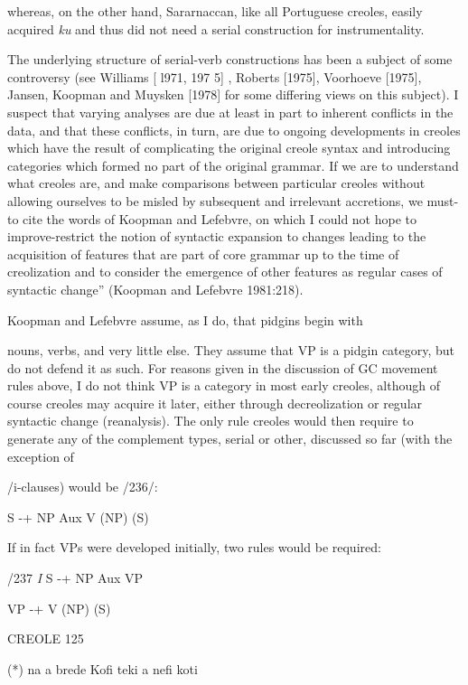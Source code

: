 whereas, on the other hand, Sararnaccan, like all Portuguese creoles, easily acquired \textit{ku} and thus did not need a serial construction for instrumentality.

The underlying structure of serial-verb constructions has been a subject of some controversy (see Williams [ l971, 197 5] , Roberts [1975], Voorhoeve [1975], Jansen, Koopman and Muysken [1978] for some differing views on this subject). I suspect that varying analyses are due at least in part to inherent conflicts in the data, and that these conflicts, in turn, are due to ongoing developments in creoles which have the result of complicating the original creole syntax and intro\-ducing categories which formed no part of the original grammar. If we are to understand what creoles are, and make comparisons between particular creoles without allowing ourselves to be misled by sub\-sequent and irrelevant accretions, we must-to cite the words of Koop\-man and Lefebvre, on which I could not hope to improve{}-{\textquotedbl}restrict the notion of syntactic expansion to changes leading to the acquisition of features that are part of core grammar up to the time of creolization and to consider the emergence of other features as regular cases of syntactic change'' (Koopman and Lefebvre 1981:218).

Koopman and Lefebvre assume, as I do, that pidgins begin with


nouns, verbs, and very little else. They assume that VP is a pidgin category, but do not defend it as such. For reasons given in the dis\-cussion of GC movement rules above, I do not think VP is a category in most early creoles, although of course creoles may acquire it later, either through decreolization or regular syntactic change (reanalysis). The only rule creoles would then require to generate any of the comple\-ment types, serial or other, discussed so far (with the exception of

/i-clauses) would be /236/:

\ea\label{ex:236}
 S {}-+ NP Aux V (NP) (S)
\glt
\z

If in fact VPs were developed initially, two rules would be required:

/237 \textit{I} S {}-+ NP Aux VP

\ea\label{ex:238}
 VP {}-+ V (NP) (S)
\glt
\z

CREOLE 125

\ea\label{ex:243}
 (*) na a brede Kofi teki a nefi koti
\glt
\z

